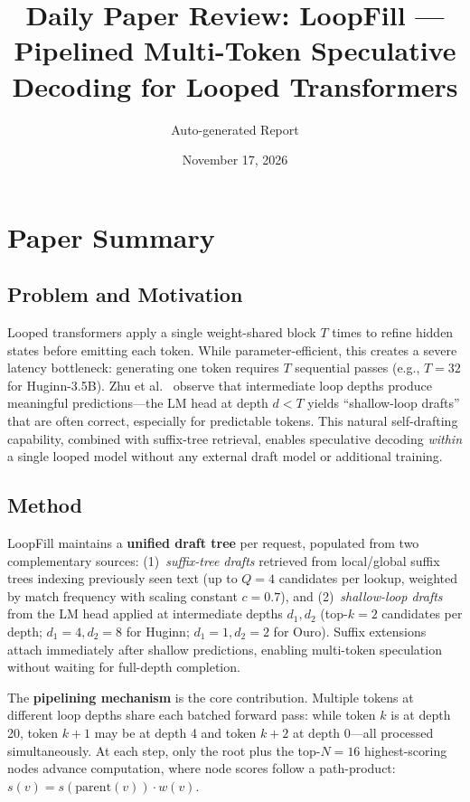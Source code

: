 \documentclass[11pt,a4paper]{article}
\title{Daily Paper Review: LoopFill --- Pipelined Multi-Token Speculative\\Decoding for Looped Transformers}
\author{Auto-generated Report}
\date{November 17, 2026}
\begin{document}
\maketitle

\section{Paper Summary}

\subsection{Problem and Motivation}
Looped transformers apply a single weight-shared block $T$ times to refine hidden states before emitting each token. While parameter-efficient, this creates a severe latency bottleneck: generating one token requires $T$ sequential passes (e.g., $T{=}32$ for Huginn-3.5B). Zhu et al.~\cite{zhu2026loopfill} observe that intermediate loop depths produce meaningful predictions---the LM head at depth $d < T$ yields ``shallow-loop drafts'' that are often correct, especially for predictable tokens. This natural self-drafting capability, combined with suffix-tree retrieval, enables speculative decoding \emph{within} a single looped model without any external draft model or additional training.

\subsection{Method}
LoopFill maintains a \textbf{unified draft tree} per request, populated from two complementary sources: (1)~\emph{suffix-tree drafts} retrieved from local/global suffix trees indexing previously seen text (up to $Q{=}4$ candidates per lookup, weighted by match frequency with scaling constant $c{=}0.7$), and (2)~\emph{shallow-loop drafts} from the LM head applied at intermediate depths $d_1, d_2$ (top-$k{=}2$ candidates per depth; $d_1{=}4, d_2{=}8$ for Huginn; $d_1{=}1, d_2{=}2$ for Ouro). Suffix extensions attach immediately after shallow predictions, enabling multi-token speculation without waiting for full-depth completion.

The \textbf{pipelining mechanism} is the core contribution. Multiple tokens at different loop depths share each batched forward pass: while token $k$ is at depth 20, token $k{+}1$ may be at depth 4 and token $k{+}2$ at depth 0---all processed simultaneously. At each step, only the root plus the top-$N{=}16$ highest-scoring nodes advance computation, where node scores follow a path-product: $s(v) = s(\mathrm{parent}(v)) \cdot w(v)$.
\end{document}
